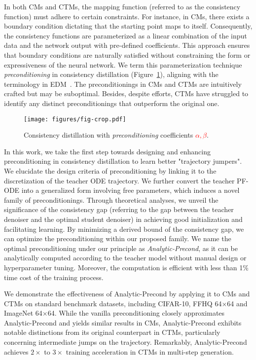 In both CMs and CTMs, the mapping function (referred to as the consistency function) must adhere to certain constraints. For instance, in CMs, there exists a boundary condition dictating that the starting point maps to itself. Consequently, the consistency functions are parameterized as a linear combination of the input data and the network output with pre-defined coefficients. This approach ensures that boundary conditions are naturally satisfied without constraining the form or expressiveness of the neural network. We term this parameterization technique \textit{preconditioning} in consistency distillation (Figure~\ref{fig:pipeline}), aligning with the terminology in EDM~\citep{karras2022elucidating}. The preconditionings in CMs and CTMs are intuitively crafted but may be suboptimal. Besides, despite efforts, CTMs have struggled to identify any distinct preconditionings that outperform the original one.

\begin{figure}[t]
    \centering
	\texttt{[image: figures/fig-crop.pdf]}
\vspace{-.1in}
\caption{\label{fig:pipeline}Consistency distillation with \textit{preconditioning} coefficients \textcolor{red}{$\alpha,\beta$}.}
\vspace{-.1in}
\end{figure}

In this work, we take the first step towards designing and enhancing preconditioning in consistency distillation to learn better "trajectory jumpers". We elucidate the design criteria of preconditioning by linking it to the discretization of the teacher ODE trajectory. We further convert the 
teacher PF-ODE into a generalized form involving free parameters, which induces a novel family of preconditionings. Through theoretical analyses, we unveil the significance of the consistency gap (referring to the gap between the teacher denoiser and the optimal student denoiser) in achieving good initialization and facilitating learning. By minimizing a derived bound of the consistency gap, we can optimize the preconditioning within our proposed family. We name the optimal preconditioning under our principle as \textit{Analytic-Precond}, as it can be analytically computed according to the teacher model without manual design or hyperparameter tuning. Moreover, the computation is efficient with less than 1\% time cost of the training process.

We demonstrate the effectiveness of Analytic-Precond by applying it to CMs and CTMs on standard benchmark datasets, including CIFAR-10, FFHQ 64$\times$64 and ImageNet 64$\times$64. While the vanilla preconditioning closely approximates Analytic-Precond and yields similar results in CMs, Analytic-Precond exhibits notable distinctions from its original counterpart in CTMs, particularly concerning intermediate jumps on the trajectory. Remarkably, Analytic-Precond achieves $2\times$ to $3\times$ training acceleration in CTMs in multi-step generation.